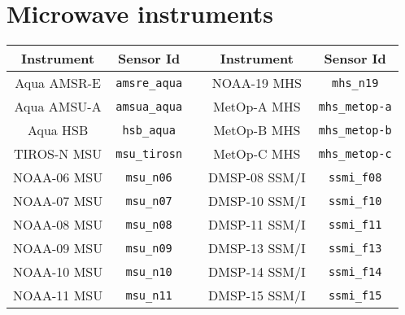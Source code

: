 \section{Microwave instruments}
\label{sec:microwave_instruments_sensor_id}

\begin{table}[htp]
  \centering
  \begin{tabular}{c c c c c}
    \hline
    \sffamily\textbf{Instrument} & \sffamily\textbf{Sensor Id} & \hspace{0.2cm} & \sffamily\textbf{Instrument} & \sffamily\textbf{Sensor Id} \\
    \hline\hline
Aqua AMSR-E     & \texttt{amsre\_aqua}    & \hspace{0.2cm} & NOAA-19 MHS      & \texttt{mhs\_n19}           \\
Aqua AMSU-A     & \texttt{amsua\_aqua}    & \hspace{0.2cm} & MetOp-A MHS      & \texttt{mhs\_metop-a}       \\
Aqua HSB        & \texttt{hsb\_aqua}      & \hspace{0.2cm} & MetOp-B MHS      & \texttt{mhs\_metop-b}       \\
TIROS-N MSU     & \texttt{msu\_tirosn}    & \hspace{0.2cm} & MetOp-C MHS      & \texttt{mhs\_metop-c}       \\
NOAA-06 MSU     & \texttt{msu\_n06}       & \hspace{0.2cm} & DMSP-08 SSM/I    & \texttt{ssmi\_f08}          \\
NOAA-07 MSU     & \texttt{msu\_n07}       & \hspace{0.2cm} & DMSP-10 SSM/I    & \texttt{ssmi\_f10}          \\
NOAA-08 MSU     & \texttt{msu\_n08}       & \hspace{0.2cm} & DMSP-11 SSM/I    & \texttt{ssmi\_f11}          \\
NOAA-09 MSU     & \texttt{msu\_n09}       & \hspace{0.2cm} & DMSP-13 SSM/I    & \texttt{ssmi\_f13}          \\
NOAA-10 MSU     & \texttt{msu\_n10}       & \hspace{0.2cm} & DMSP-14 SSM/I    & \texttt{ssmi\_f14}          \\
NOAA-11 MSU     & \texttt{msu\_n11}       & \hspace{0.2cm} & DMSP-15 SSM/I    & \texttt{ssmi\_f15}          \\

\end{tabular}
\end{table}
